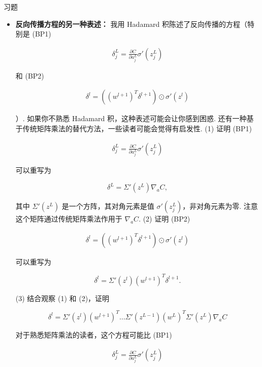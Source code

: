 \begin{exerciseBox}{习题}

\begin{itemize}

\item
\textbf{反向传播方程的另一种表述：} 我用 Hadamard 积陈述了反向传播的方程（特别是 (BP1)

\begin{align*}
\delta^L_j = \frac{\partial C}{\partial a^L_j} \sigma'(z^L_j) \nonumber
\end{align*}

和 (BP2)

\begin{align*}
\delta^l = ((w^{l+1})^T \delta^{l+1}) \odot \sigma'(z^l) \nonumber
\end{align*}

）. 如果你不熟悉 Hadamard 积，这种表述可能会让你感到困惑. 还有一种基于传统矩阵乘法的替代方法，一些读者可能会觉得有启发性. (1) 证明 (BP1)

\begin{align*}
\delta^L_j = \frac{\partial C}{\partial a^L_j} \sigma'(z^L_j) \nonumber
\end{align*}

可以重写为

\begin{equation}
\delta^L = \Sigma'(z^L) \nabla_a C,
\tag{33}
\end{equation}

其中 $\Sigma'(z^L)$ 是一个方阵，其对角元素是值 $\sigma'(z^L_j)$，非对角元素为零. 注意这个矩阵通过传统矩阵乘法作用于 $\nabla_a C$. (2) 证明 (BP2)

\begin{align*}
\delta^l = ((w^{l+1})^T \delta^{l+1}) \odot \sigma'(z^l) \nonumber
\end{align*}

可以重写为

\begin{equation}
\delta^l = \Sigma'(z^l) (w^{l+1})^T \delta^{l+1}.
\tag{34}
\end{equation}

(3) 结合观察 (1) 和 (2)，证明

\begin{equation}
\delta^l = \Sigma'(z^l) (w^{l+1})^T \ldots \Sigma'(z^{L-1}) (w^L)^T \Sigma'(z^L) \nabla_a C
\tag{35}
\end{equation}

对于熟悉矩阵乘法的读者，这个方程可能比 (BP1)

\begin{align*}
\delta^L_j = \frac{\partial C}{\partial a^L_j} \sigma'(z^L_j) \nonumber
\end{align*}


\end{itemize}
\end{exerciseBox}
